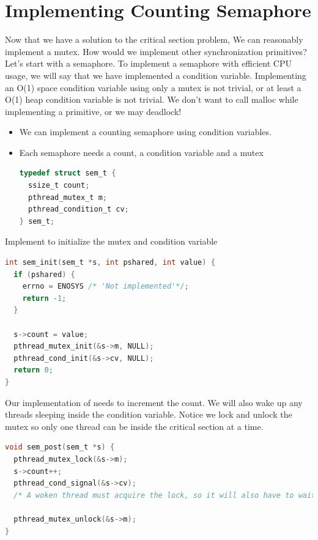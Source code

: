 \section{Implementing Counting Semaphore}

Now that we have a solution to the critical section problem, We can reasonably implement a mutex.
How would we implement other synchronization primitives?
Let's start with a semaphore.
To implement a semaphore with efficient CPU usage, we will say that we have implemented a condition variable.
Implementing an O(1) space condition variable using only a mutex is not trivial, or at least a O(1) heap condition variable is not trivial.
We don't want to call malloc while implementing a primitive, or we may deadlock!

\begin{itemize}
\item
  We can implement a counting semaphore using condition variables.
\item
  Each semaphore needs a count, a condition variable and a mutex
\begin{lstlisting}[language=C]
typedef struct sem_t {
  ssize_t count;
  pthread_mutex_t m;
  pthread_condition_t cv;
} sem_t;
\end{lstlisting}
\end{itemize}

Implement  to initialize the mutex and condition variable

\begin{lstlisting}[language=C]
int sem_init(sem_t *s, int pshared, int value) {
  if (pshared) {
    errno = ENOSYS /* 'Not implemented'*/;
    return -1;
  }

  s->count = value;
  pthread_mutex_init(&s->m, NULL);
  pthread_cond_init(&s->cv, NULL);
  return 0;
}
\end{lstlisting}

Our implementation of  needs to increment the count.
We will also wake up any threads sleeping inside the condition variable.
Notice we lock and unlock the mutex so only one thread can be inside the critical section at a time.

\begin{lstlisting}[language=C]
void sem_post(sem_t *s) {
  pthread_mutex_lock(&s->m);
  s->count++;
  pthread_cond_signal(&s->cv);
  /* A woken thread must acquire the lock, so it will also have to wait until we call unlock*/

  pthread_mutex_unlock(&s->m);
}
\end{lstlisting}

